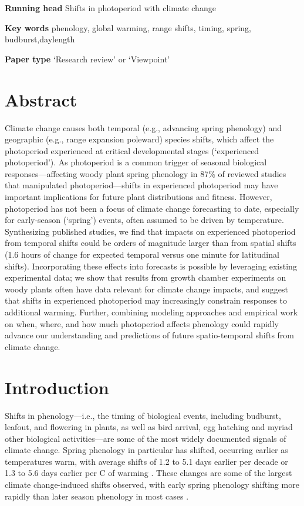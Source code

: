 \documentclass{article}
\begin{document}
\textbf{Running head} Shifts in photoperiod with climate change

\textbf{Key words} phenology, global warming, range shifts, timing, spring, budburst,daylength 

\textbf{Paper type} `Research review' or `Viewpoint'



\newpage
\linenumbers
\section*{Abstract}
Climate change causes both temporal (e.g., advancing spring phenology) and geographic (e.g., range expansion poleward) species shifts, which affect the photoperiod experienced at critical developmental stages (`experienced photoperiod'). As photoperiod is a common trigger of seasonal biological responses---affecting woody plant spring phenology in 87\% of reviewed studies that manipulated photoperiod---shifts in experienced photoperiod may have important implications for future plant distributions and fitness. However, photoperiod has not been a focus of climate change forecasting to date, especially for early-season (`spring') events, often assumed to be driven by temperature. Synthesizing published studies, we find that impacts on experienced photoperiod from temporal shifts could be orders of magnitude larger than from spatial shifts (1.6 hours of change for expected temporal versus one minute for latitudinal shifts). Incorporating these effects into forecasts is possible by leveraging existing experimental data; we show that results from growth chamber experiments on woody plants often have data relevant for climate change impacts, and suggest that shifts in experienced photoperiod may increasingly constrain responses to additional warming. Further, combining modeling approaches and empirical work on when, where, and how much photoperiod affects phenology could rapidly advance our understanding and predictions of future spatio-temporal shifts from climate change. 

\newpage
\section*{Introduction}

\par Shifts in phenology---i.e., the timing of biological events, including budburst, leafout, and flowering in plants, as well as bird arrival, egg hatching and myriad other biological activities---are some of the most widely documented signals of climate change. Spring phenology in particular has shifted, occurring earlier as temperatures warm, with average shifts of 1.2 to 5.1 days earlier per decade \citep{bradley1999,parmesan2003, poloczanska2013,root2003} or 1.3 to 5.6 days earlier per \degree C of warming \citep{polgar2013,Wolkovich:2012n}. These changes are some of the largest climate change-induced shifts observed, with early spring phenology shifting more rapidly than later season phenology in most cases \citep{bradley1999,menzel2006}. 
\end{document}
